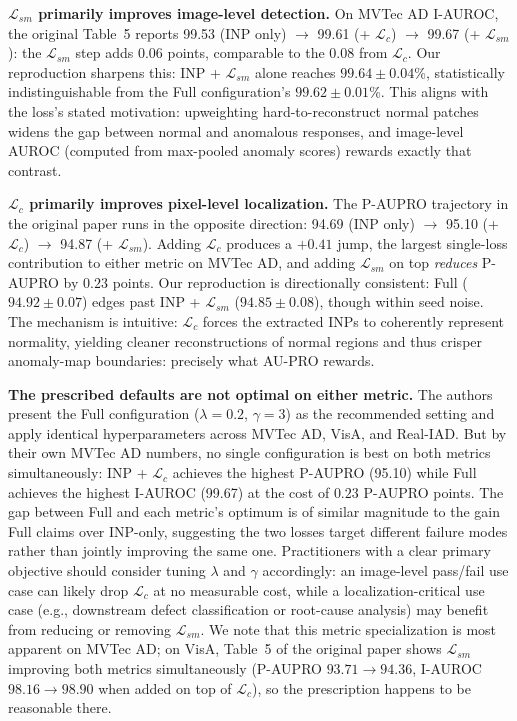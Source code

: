 \documentclass[10pt]{article} %
\begin{document}
\textbf{$\mathcal{L}_{sm}$ primarily improves image-level detection.} On MVTec AD I-AUROC, the original Table~5 reports 99.53 (INP only) $\to$ 99.61 (+ $\mathcal{L}_c$) $\to$ 99.67 (+ $\mathcal{L}_{sm}$): the $\mathcal{L}_{sm}$ step adds 0.06 points, comparable to the 0.08 from $\mathcal{L}_c$. Our reproduction sharpens this: INP + $\mathcal{L}_{sm}$ alone reaches $99.64 \pm 0.04$\%, statistically indistinguishable from the Full configuration's $99.62 \pm 0.01$\%. This aligns with the loss's stated motivation: upweighting hard-to-reconstruct normal patches widens the gap between normal and anomalous responses, and image-level AUROC (computed from max-pooled anomaly scores) rewards exactly that contrast.

\textbf{$\mathcal{L}_c$ primarily improves pixel-level localization.} The P-AUPRO trajectory in the original paper runs in the opposite direction: 94.69 (INP only) $\to$ 95.10 (+ $\mathcal{L}_c$) $\to$ 94.87 (+ $\mathcal{L}_{sm}$). Adding $\mathcal{L}_c$ produces a $+0.41$ jump, the largest single-loss contribution to either metric on MVTec AD, and adding $\mathcal{L}_{sm}$ on top \emph{reduces} P-AUPRO by $0.23$ points. Our reproduction is directionally consistent: Full ($94.92 \pm 0.07$) edges past INP + $\mathcal{L}_{sm}$ ($94.85 \pm 0.08$), though within seed noise. The mechanism is intuitive: $\mathcal{L}_c$ forces the extracted INPs to coherently represent normality, yielding cleaner reconstructions of normal regions and thus crisper anomaly-map boundaries: precisely what AU-PRO rewards.

\textbf{The prescribed defaults are not optimal on either metric.} The authors present the Full configuration ($\lambda=0.2$, $\gamma=3$) as the recommended setting and apply identical hyperparameters across MVTec AD, VisA, and Real-IAD. But by their own MVTec AD numbers, no single configuration is best on both metrics simultaneously: INP + $\mathcal{L}_c$ achieves the highest P-AUPRO (95.10) while Full achieves the highest I-AUROC (99.67) at the cost of $0.23$ P-AUPRO points. The gap between Full and each metric's optimum is of similar magnitude to the gain Full claims over INP-only, suggesting the two losses target different failure modes rather than jointly improving the same one. Practitioners with a clear primary objective should consider tuning $\lambda$ and $\gamma$ accordingly: an image-level pass/fail use case can likely drop $\mathcal{L}_c$ at no measurable cost, while a localization-critical use case (e.g., downstream defect classification or root-cause analysis) may benefit from reducing or removing $\mathcal{L}_{sm}$. We note that this metric specialization is most apparent on MVTec AD; on VisA, Table~5 of the original paper shows $\mathcal{L}_{sm}$ improving both metrics simultaneously (P-AUPRO $93.71 \to 94.36$, I-AUROC $98.16 \to 98.90$ when added on top of $\mathcal{L}_c$), so the prescription happens to be reasonable there.
\end{document}
